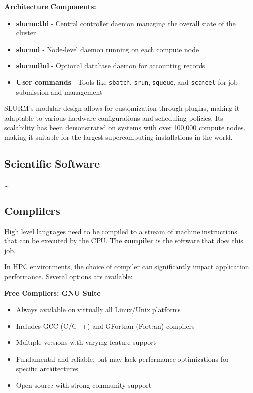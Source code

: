 \textbf{Architecture Components:}
\begin{itemize}
    \item \textbf{slurmctld} - Central controller daemon managing the overall state of the cluster
    \item \textbf{slurmd} - Node-level daemon running on each compute node
    \item \textbf{slurmdbd} - Optional database daemon for accounting records
    \item \textbf{User commands} - Tools like \texttt{sbatch}, \texttt{srun}, \texttt{squeue}, and \texttt{scancel} for job submission and management
\end{itemize}

SLURM's modular design allows for customization through plugins, making it adaptable to various hardware configurations and scheduling policies. Its scalability has been demonstrated on systems with over 100,000 compute nodes, making it suitable for the largest supercomputing installations in the world.

\subsection{Scientific Software}

\dots

\subsection{Complilers}

High level languages need to be compiled to a stream of machine instructions that can be executed by the CPU. The \textbf{compiler} is the software that does this job. 

In HPC environments, the choice of compiler can significantly impact application performance. Several options are available:

\textbf{Free Compilers: GNU Suite}
\begin{itemize}
    \item Always available on virtually all Linux/Unix platforms
    \item Includes GCC (C/C++) and GFortran (Fortran) compilers
    \item Multiple versions with varying feature support
    \item Fundamental and reliable, but may lack performance optimizations for specific architectures
    \item Open source with strong community support
\end{itemize}

